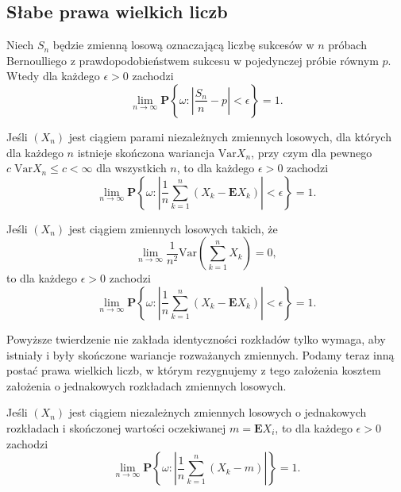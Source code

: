 \subsection{Słabe prawa wielkich liczb}	
	\begin{tw}
		Niech $S_n$ będzie zmienną losową oznaczającą liczbę sukcesów w $n$ próbach Bernoulliego z prawdopodobieństwem sukcesu w pojedynczej próbie równym $p$. Wtedy dla każdego $\epsilon > 0$ zachodzi
		\begin{equation*}
			\lim_{n \to \infty} \textbf{P} \left\{ 
			\omega : \left| 
			\frac{S_n}{n} - p
			\right| < \epsilon
			\right\} = 1.
		\end{equation*}
	\end{tw}
	
	\begin{tw}
		Jeśli $(X_n)$ jest ciągiem parami niezależnych zmiennych losowych, dla których dla każdego $n$ istnieje skończona wariancja $\text{Var}X_n$, przy czym dla pewnego $c \; \text{Var}X_n \leq c < \infty$ dla wszystkich $n$, to dla każdego $\epsilon > 0$ zachodzi
		\begin{equation*}
			\lim_{n \to \infty} \textbf{P} \left\{ 
			\omega : \left| 
			\frac{1}{n} \sum_{k=1}^{n} \left( X_k - \textbf{E}X_k\right)		
			\right| < \epsilon
			\right\} = 1.
		\end{equation*}
	\end{tw}

	\begin{tw}
		Jeśli $(X_n)$ jest ciągiem zmiennych losowych takich, że
		\begin{equation}
			\lim_{n \to \infty} \frac{1}{n^2} \text{Var}\left( \sum_{k=1}^n X_k \right) = 0, 
		\end{equation}
		to dla każdego $\epsilon > 0$ zachodzi
		\begin{equation*}
			\lim_{n \to \infty} \textbf{P} \left\{ 
				\omega : \left| 
							\frac{1}{n} \sum_{k=1}^{n} \left( X_k - \textbf{E}X_k\right)		
						\right| < \epsilon
			\right\} = 1.
		\end{equation*}
	\end{tw}
	Powyższe twierdzenie nie zakłada identyczności rozkładów tylko wymaga, aby istniały i były skończone wariancje rozważanych zmiennych. Podamy teraz inną postać prawa wielkich liczb, w którym rezygnujemy z tego założenia kosztem założenia o jednakowych rozkładach zmiennych losowych.
	\begin{tw}
		Jeśli $(X_n)$ jest ciągiem niezależnych zmiennych losowych o jednakowych rozkładach i skończonej wartości oczekiwanej $m=\textbf{E}X_i$, to dla każdego $\epsilon > 0$ zachodzi
		\begin{equation*}
		\lim_{n \to \infty} \textbf{P}
		 \left\{ 
			\omega : \left|  \frac{1}{n} \sum_{k=1}^{n} \left( X_k - m \right) \right|
		\right\} = 1.
		\end{equation*}
	\end{tw}
\newpage	
